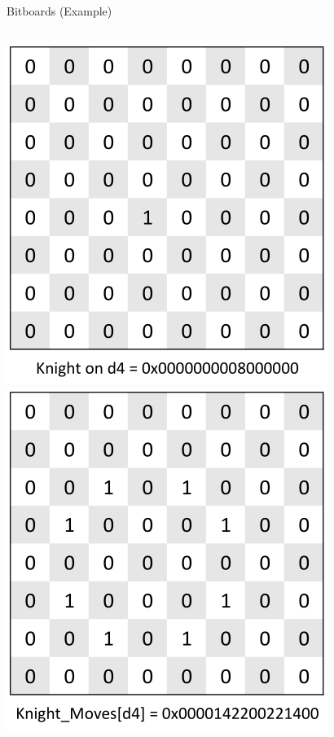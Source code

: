 \documentclass[xcolor=pdftex,dvipsnames,table]{beamer}
\begin{document}
\begin{frame}{Bitboards (Example)}
\begin{center}
\begin{columns}[c]
\includegraphics[width=\textwidth,keepaspectratio]{bitboards1.png}
\includegraphics[width=\textwidth,keepaspectratio]{bitboards2.png}
\end{columns}
\end{center}
\end{frame}
\end{document}
